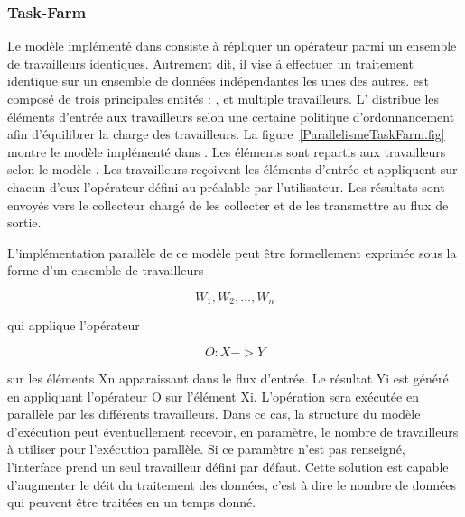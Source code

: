 \subsubsection{Task-Farm}

Le mod\`ele  impl\'ement\'e dans   consiste \`a r\'epliquer un op\'erateur parmi un ensemble de travailleurs identiques. Autrement dit, il vise \'a effectuer un traitement identique sur un ensemble de donn\'ees ind\'ependantes les unes des autres.  est compos\'e de trois principales entit\'es : ,  et multiple travailleurs. L' distribue les \'el\'ements d'entr\'ee aux travailleurs selon une certaine politique d'ordonnancement afin d'\'equilibrer la charge des travailleurs. La figure~\ref{ParallelismeTaskFarm.fig} montre le mod\`ele  impl\'ement\'e dans . Les \'el\'ements sont repartis aux travailleurs selon le mod\`ele . Les travailleurs re\c coivent les \'el\'ements d'entr\'ee et appliquent sur chacun d'eux l'op\'erateur d\'efini au pr\'ealable par l'utilisateur. Les r\'esultats sont envoy\'es vers le collecteur charg\'e de les collecter et de les transmettre au flux de sortie.



L'impl\'ementation parall\`ele de ce mod\`ele peut \^etre formellement exprim\'ee sous la forme d'un ensemble de travailleurs 

\[
	{W_1, W_2,\ldots, W_n}
\]

qui applique l'op\'erateur 

\[
	O : X -> Y
\]

sur les \'el\'ements Xn apparaissant dans le flux d'entr\'ee. Le r\'esultat Yi est g\'en\'er\'e en appliquant l'op\'erateur O sur l'\'el\'ement Xi. L'op\'eration sera ex\'ecut\'ee en parall\`ele par les diff\'erents travailleurs. Dans ce cas, la structure du mod\`ele d'ex\'ecution peut \'eventuellement recevoir, en param\`etre, le nombre de travailleurs \`a utiliser pour l'ex\'ecution parall\`ele. Si ce param\`etre n'est pas renseign\'e, l'interface prend un seul travailleur d\'efini par d\'efaut. Cette solution est capable d'augmenter le d\'eit du traitement des donn\'ees, c'est \`a dire le nombre de donn\'ees qui peuvent \^etre trait\'ees en un temps donn\'e.

